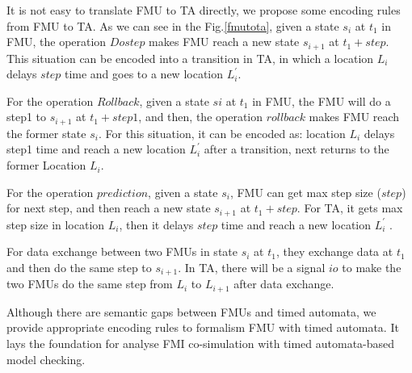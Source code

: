 It is not easy to translate FMU to TA directly, we propose some encoding rules from FMU to TA. As we can see in the Fig.\ref{fmutota}, given a state $s_{i}$ at $t_{1}$ in FMU, the operation $Dostep$ makes FMU reach a new state $s_{i+1}$ at $t_{1}+step$. This situation can be encoded into a transition in TA, in which a location $L_{i}$ delays $step$ time and goes to a new location $L_{i}^{\prime}$.

For the operation $Rollback$, given a state $s{i}$ at $t_{1}$ in FMU, the FMU will do a step1 to $s_{i+1}$ at $t_{1}+step1$, and then, the operation $rollback$ makes FMU reach the former state $s_{i}$. For this situation, it can be encoded as: location $L_{i}$ delays step1 time and reach a new location $L_{i}^{\prime}$ after a transition, next returns to the former Location $L_{i}$. 

For the operation $prediction$, given a state $s_{i}$, FMU can get max step size ($step$) for next step, and then reach a new state $s_{i+1}$ at $t_{1}+step$. For TA, it gets max step size in location $L_{i}$, then it delays $step$ time and reach a new location $L_{i}^{\prime}$ .

For data exchange between two FMUs in state $s_{i}$ at $t_{1}$, they exchange data at $t_{1}$ and then do the same step to $s_{i+1}$. In TA, there will be a signal $io$ to make the two FMUs do the same step from $L_{i}$ to $L_{i+1}$ after data exchange.

Although there are semantic gaps between FMUs and timed automata, we provide appropriate encoding rules to formalism FMU with timed automata. It lays the foundation for analyse FMI co-simulation with timed automata-based model checking.


